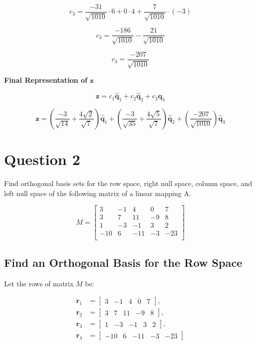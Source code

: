 \documentclass{article}
\begin{document}
\[
c_3 = \frac{-31}{\sqrt{1010}} \cdot 6 + 0 \cdot 4 + \frac{7}{\sqrt{1010}} \cdot (-3)
\]

\[
c_3 = \frac{-186}{\sqrt{1010}} - \frac{21}{\sqrt{1010}}
\]

\[
c_3 = \frac{-207}{\sqrt{1010}}
\]

\textbf{Final Representation of \(\mathbf{z}\)}

\[
\mathbf{z} = c_1 \hat{\mathbf{q}}_1 + c_2 \hat{\mathbf{q}}_2 + c_3 \hat{\mathbf{q}}_3
\]

\[
\mathbf{z} = \left( \frac{-3}{\sqrt{14}} + \frac{4\sqrt{2}}{\sqrt{7}} \right) \hat{\mathbf{q}}_1 + \left( \frac{-3}{\sqrt{35}} + \frac{4\sqrt{5}}{\sqrt{7}} \right) \hat{\mathbf{q}}_2 + \left( \frac{-207}{\sqrt{1010}} \right) \hat{\mathbf{q}}_3
\]

\section{Question 2}

Find orthogonal basis sets for the row space, right null space, column space, and
left null space of the following matrix of a linear mapping A.

\[
M = \begin{bmatrix}
    3 & -1 & 4 & 0 & 7 \\
    3 & 7 & 11 & -9 & 8 \\
    1 & -3 & -1 & 3 & 2 \\
    -10 & 6 & -11 & -3 & -23 \\
\end{bmatrix}
\]

\subsection{Find an Orthogonal Basis for the Row Space}

Let the rows of matrix \( M \) be:

\begin{align*}
    \mathbf{r}_1 &= \begin{bmatrix} 3 & -1 & 4 & 0 & 7 \end{bmatrix}, \\
    \mathbf{r}_2 &= \begin{bmatrix} 3 & 7 & 11 & -9 & 8 \end{bmatrix}, \\
    \mathbf{r}_3 &= \begin{bmatrix} 1 & -3 & -1 & 3 & 2 \end{bmatrix}, \\
    \mathbf{r}_4 &= \begin{bmatrix} -10 & 6 & -11 & -3 & -23 \end{bmatrix}
\end{align*}
\end{document}
